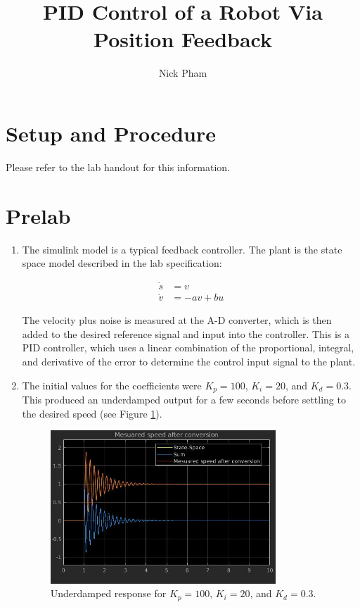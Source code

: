 \documentclass{journal}
\title{PID Control of a Robot Via Position Feedback}
\author{Nick Pham}
\begin{document}

\maketitle

\section*{Setup and Procedure}

Please refer to the lab handout for this information.

\section*{Prelab}
\begin{enumerate}[label=(\alph*)]
	\item %
	The simulink model is a typical feedback controller.  The plant is the state space model described in the lab specification:

	\begin{align}
		\dot{s} &= v \\
		\dot{v} &= -av + bu
	\end{align}

	The velocity plus noise is measured at the A-D converter, which is then added to the desired reference signal and input into the controller.  This is a PID controller, which uses a linear combination of the proportional, integral, and derivative of the error to determine the control input signal to the plant.

	\item %
	The initial values for the coefficients were $K_p = 100$, $K_i = 20$, and $K_d = 0.3$.  This produced an underdamped output for a few seconds before settling to the desired speed (see Figure \ref{fig:PID_100_20_03}).

	\begin{figure}[H]
		\centering
		\includegraphics[width = 0.8\textwidth]{Lab1PID_100_20_0point3.jpg}
		\caption{Underdamped response for $K_p = 100$, $K_i = 20$, and $K_d = 0.3$.}
		\label{fig:PID_100_20_03}
	\end{figure}


\end{enumerate}
\end{document}
